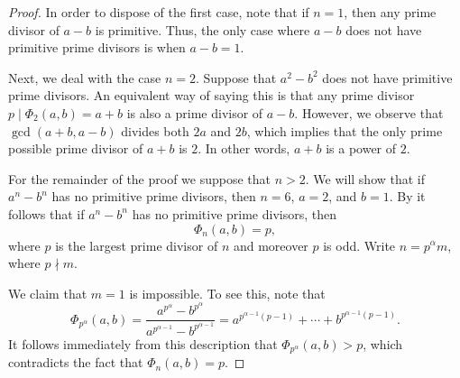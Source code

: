 \begin{proof}
  In order to dispose of the first case, note that if $n=1$, then any prime divisor of $a-b$ is primitive. Thus, the only case where $a-b$ does not have primitive prime divisors is when $a-b=1$.

  Next, we deal with the case $n=2$. Suppose that $a^2-b^2$ does not have primitive prime divisors. An equivalent way of saying this is that any prime divisor $p\mid \Phi_2(a,b)=a+b$ is also a prime divisor of $a-b$. However, we observe that $\gcd(a+b,a-b)$ divides both $2a$ and $2b$, which implies that the only prime possible prime divisor of $a+b$ is $2$. In other words, $a+b$ is a power of $2$.
  
  For the remainder of the proof we suppose that $n>2$. We will show that if $a^n-b^n$ has no primitive prime divisors, then $n=6$, $a=2$, and $b=1$. By  it follows that if $a^n-b^n$ has no primitive prime divisors, then
  \begin{equation*}
    \Phi_n(a,b)=p,
  \end{equation*}
  where $p$ is the largest prime divisor of $n$ and moreover $p$ is odd. Write $n=p^\alpha m$, where $p\nmid m$. 

  We claim that $m=1$ is impossible. To see this, note that
  \begin{equation*}
    \Phi_{p^\alpha}(a,b)=\frac{a^{p^\alpha}-b^{p^\alpha}}{a^{p^{\alpha-1}}-b^{p^{\alpha-1}}}=a^{p^{\alpha-1}(p-1)}+\cdots + b^{p^{\alpha-1}(p-1)}.
  \end{equation*}
  It follows immediately from this description that $\Phi_{p^\alpha}(a,b)>p$, which contradicts the fact that $\Phi_n(a,b)=p$.


\end{proof}
